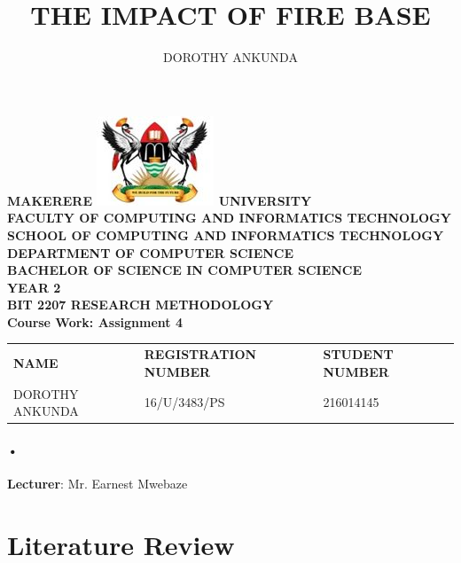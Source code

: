 \documentclass[7pt]{article}
\begin{document}
\begin{Huge}
\begin{center}
\begin{normalsize}
\textbf{MAKERERE \includegraphics[scale=0.5]{logo} UNIVERSITY }\\

\textbf{FACULTY OF COMPUTING AND INFORMATICS TECHNOLOGY} \\
\textbf{SCHOOL OF COMPUTING AND INFORMATICS TECHNOLOGY} \\
\textbf{DEPARTMENT OF COMPUTER SCIENCE} \\
\textbf{BACHELOR OF SCIENCE IN COMPUTER SCIENCE} \\
\textbf{YEAR 2} \\
\textbf{BIT 2207 RESEARCH METHODOLOGY} \\
\textbf{Course Work: Assignment 4}\\
\end{normalsize}
\end{center}
\end{Huge}

\begin{center}
\begin{tabular}{l l l}
\textbf{NAME}  & \textbf{REGISTRATION NUMBER} & \textbf{STUDENT NUMBER} \\
DOROTHY ANKUNDA & 16/U/3483/PS & 216014145 \\
\end{tabular}

\paragraph{•}
\textbf{Lecturer}: Mr. Earnest Mwebaze
\end{center}

\newpage

\title{THE IMPACT OF FIRE BASE}
\author{DOROTHY ANKUNDA}      
\renewcommand{\today}{}

\maketitle

\section{Literature Review}
\end{document}
